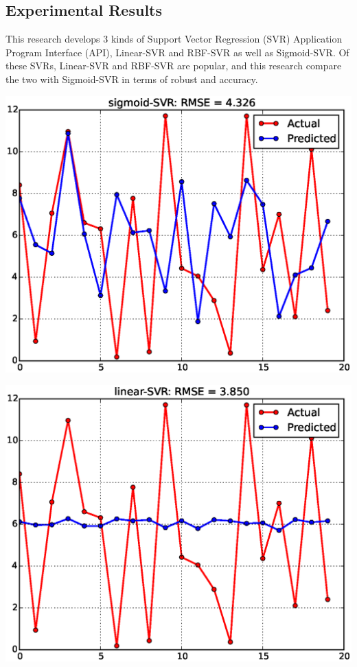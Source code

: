 \documentclass[a0b,portrait]{a0poster}
\begin{document}
\begin{multicols}{3}
\section*{Experimental Results}
This research develops 3 kinds of Support Vector Regression (SVR) Application Program Interface (API), Linear-SVR and RBF-SVR as well as Sigmoid-SVR. Of these SVRs, Linear-SVR and RBF-SVR are popular, and this research compare the two with Sigmoid-SVR in terms of robust and accuracy.
\begin{center}
\includegraphics[width=\linewidth]{sigmoid-SVR.eps}
\end{center}
\begin{center}
\includegraphics[width=\linewidth]{linear-SVR.eps}

\end{center}
\end{multicols}
\end{document}
